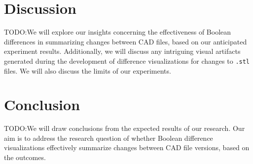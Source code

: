 \documentclass[sigconf,authorversion,nonacm]{acmart}
\begin{document}
\section{Discussion}

TODO:We will explore our insights concerning the effectiveness of Boolean differences in summarizing changes between CAD files, based on our anticipated experiment results. Additionally, we will discuss any intriguing visual artifacts generated during the development of difference visualizations for changes to \texttt{.stl} files. We will also discuss the limits of our experiments.

\section{Conclusion}

TODO:We will draw conclusions from the expected results of our research. Our aim is to address the research question of whether Boolean difference visualizations effectively summarize changes between CAD file versions, based on the outcomes.





\end{document}
